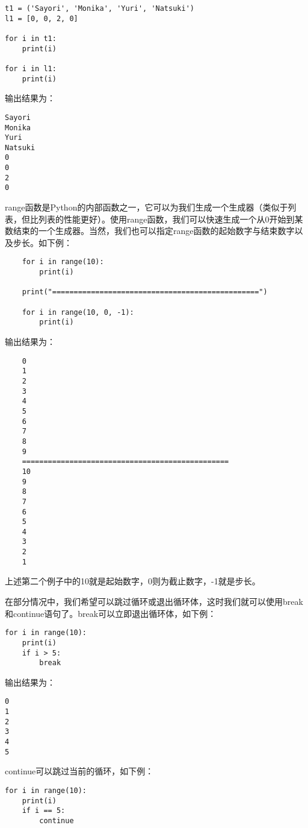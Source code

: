 \begin{lstlisting}
t1 = ('Sayori', 'Monika', 'Yuri', 'Natsuki')
l1 = [0, 0, 2, 0]

for i in t1:
    print(i)

for i in l1:
    print(i)
\end{lstlisting}

输出结果为：
\begin{lstlisting}
Sayori
Monika
Yuri
Natsuki
0
0
2
0
\end{lstlisting}

\begin{ExtraKnowledge}
    range函数是Python的内部函数之一，它可以为我们生成一个生成器（类似于列表，但比列表的性能更好）。使用range函数，我们可以快速生成一个从0开始到某数结束的一个生成器。当然，我们也可以指定range函数的起始数字与结束数字以及步长。如下例：
    \begin{lstlisting}
    for i in range(10):
        print(i)

    print("================================================")

    for i in range(10, 0, -1):
        print(i)
    \end{lstlisting}
    输出结果为：
    \begin{lstlisting}
    0
    1
    2
    3
    4
    5
    6
    7
    8
    9
    ================================================
    10
    9
    8
    7
    6
    5
    4
    3
    2
    1
    \end{lstlisting}

    上述第二个例子中的10就是起始数字，0则为截止数字，-1就是步长。
\end{ExtraKnowledge}

在部分情况中，我们希望可以跳过循环或退出循环体，这时我们就可以使用break和continue语句了。break可以立即退出循环体，如下例：

\begin{lstlisting}
for i in range(10):
    print(i)
    if i > 5:
        break
\end{lstlisting}

输出结果为：
\begin{lstlisting}
0
1
2
3
4
5
\end{lstlisting}

continue可以跳过当前的循环，如下例：

\begin{lstlisting}
for i in range(10):
    print(i)
    if i == 5:
        continue
\end{lstlisting}


